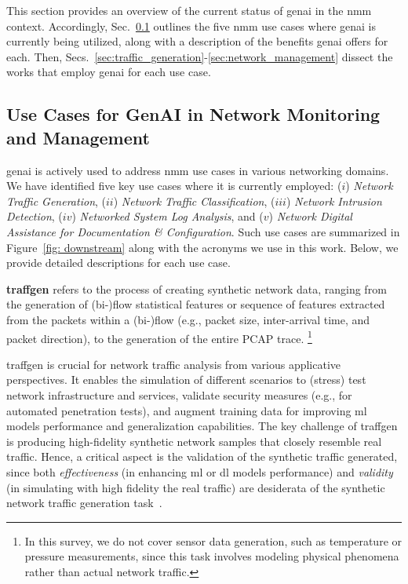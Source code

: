 


This section provides an overview of the current status of \gls{genai} in the \gls{nmm} context. Accordingly, Sec.~\ref{subsec:dowstream_tasks} outlines the five \gls{nmm} use cases where \gls{genai} is currently being utilized, along with a description of the benefits \gls{genai} offers for each. Then, Secs.~\ref{sec:traffic_generation}-\ref{sec:network_management} dissect the works that employ \gls{genai} for each use case.




\subsection{Use Cases for GenAI in Network Monitoring and Management}
\label{subsec:dowstream_tasks}



\gls{genai} is actively used to address \gls{nmm} use cases in various networking domains. We have identified five key use cases where it is currently employed: ($i$) \emph{Network Traffic Generation}, ($ii$) \emph{Network Traffic Classification}, ($iii$) \emph{Network Intrusion Detection}, ($iv$) \emph{Networked System Log Analysis}, and ($v$) \emph{Network Digital Assistance for Documentation \& Configuration}.
Such use cases are summarized in Figure~\ref{fig: downstream} along with the acronyms we use in this work. 
Below, we provide detailed descriptions for each use case.





\vspace{5pt}
\noindent
\textbf{\gls{traffgen}}
refers to the process of creating synthetic network data, ranging from
the generation of
\mbox{(bi-)flow} statistical features
or sequence of features extracted from the packets within a \mbox{(bi-)flow} (e.g., packet size, inter-arrival time, and packet direction), to the generation of
the entire PCAP trace.%
\footnote{In this survey, we do not cover sensor data generation, such as temperature or pressure measurements, since this task involves modeling physical phenomena rather than actual network traffic.}

\gls{traffgen} is crucial for network traffic analysis from various applicative perspectives. It enables the simulation of different scenarios to (stress) test network infrastructure and services, validate security measures (e.g., for automated penetration tests), and 
augment training data for improving \gls{ml} models 
performance and generalization capabilities.
The key challenge of \gls{traffgen} is producing high-fidelity synthetic network samples that closely resemble real traffic.
Hence, a critical aspect 
is the validation of the synthetic traffic generated, since both \emph{effectiveness}
(in enhancing \gls{ml} or \gls{dl} models performance) 
and \emph{validity} 
(in simulating with high fidelity the real traffic) 
are desiderata of the synthetic network traffic generation task~\cite{adeleke2022network}.

